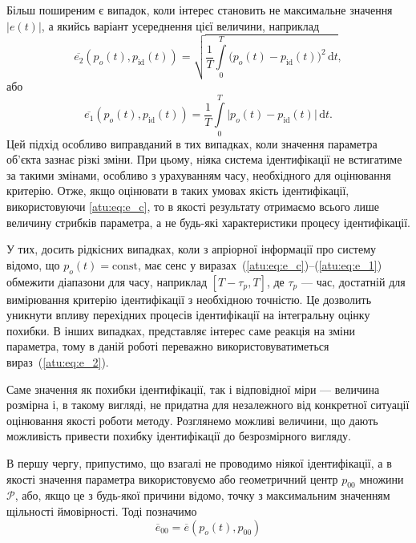 Більш поширеним є випадок, коли інтерес становить не максимальне значення
$|e(t)|$, а якийсь варіант усереднення цієї величини, наприклад
%
\begin{equation}
  \overline{e_2}(p_o(t),p_\mathrm{id}(t))
  =
  \sqrt{ \frac{1}{T} \int\limits_{0}^{T} \big( p_o(t)-p_\mathrm{id}(t) \big)^2 \, \mathrm{d}t },
  \label{atu:eq:e_2}
\end{equation}
%
або
\begin{equation}
  \overline{e_1}(p_o(t),p_\mathrm{id}(t))
  =
  \frac{1}{T} \int\limits_{0}^{T} \big| p_o(t)-p_\mathrm{id}(t) \big| \, \mathrm{d}t .
  \label{atu:eq:e_1}
\end{equation}
%
Цей підхід особливо виправданий в тих випадках, коли значення
параметра об'єкта зазнає різкі зміни. При цьому, ніяка система
ідентифікації не встигатиме за такими змінами, особливо з
урахуванням часу, необхідного для оцінювання критерію. Отже,
якщо оцінювати в таких умовах якість ідентифікації,
використовуючи \ref{atu:eq:e_c}, то в якості результату отримаємо
всього лише величину стрибків параметра, а не будь-які
характеристики процесу ідентифікації.

У тих, досить рідкісних випадках, коли з апріорної інформації
про систему відомо, що
$p_o(t) = \mathrm{const}$, має сенс у виразах~(\ref{atu:eq:e_c})--(\ref{atu:eq:e_1})
обмежити діапазони для часу, наприклад
$[T-\tau_p,T]$, де
$\tau_p$ --- час, достатній для вимірювання критерію ідентифікації з
необхідною точністю. Це дозволить уникнути впливу перехідних
процесів ідентифікації на інтегральну оцінку похибки. В
інших випадках, представляє інтерес саме реакція на зміни
параметра, тому в даній роботі переважно використовуватиметься
вираз~(\ref{atu:eq:e_2}).



Саме значення як похибки ідентифікації, так і відповідної міри ---
величина розмірна і, в такому вигляді, не придатна для незалежного від
конкретної ситуації оцінювання якості роботи методу. Розглянемо можливі
величини, що дають можливість привести похибку ідентифікації до безрозмірного
вигляду.

В першу чергу, припустимо, що взагалі не проводимо ніякої
ідентифікації, а в якості значення параметра використовуємо або геометричний
центр $p_{00}$ множини $\mathcal{P}$, або, якщо це з будь-якої причини
відомо, точку з максимальним значенням щільності ймовірності. Тоді позначимо
%
\begin{equation}
  \overline{e}_{00}
  =
  \overline{e}(p_o(t),p_{00})
  \label{atu:eq:e_00}
\end{equation}

